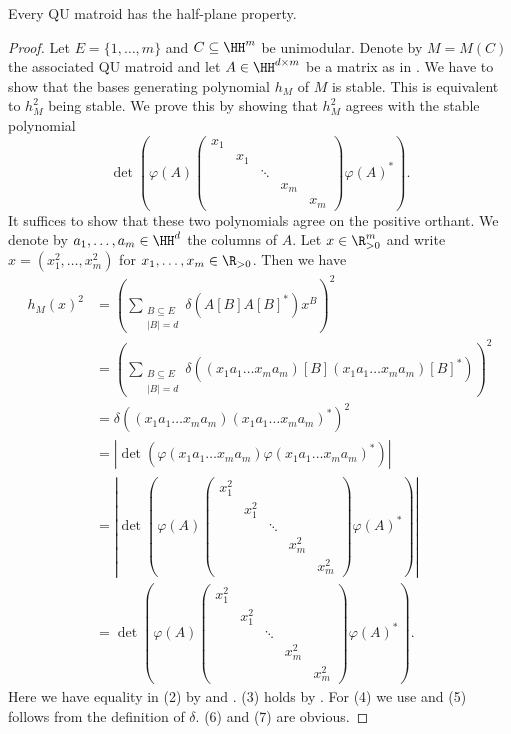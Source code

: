 \begin{thm}
    Every QU matroid has the half-plane property.
\end{thm}
\begin{proof}
  Let $E=\{1,\ldots,m\}$ and $C\subseteq\HH^m$ be unimodular. Denote by $M=M(C)$ the associated QU matroid and let $A\in\HH^{d\times m}$ be a matrix as in . We have to show that the bases generating polynomial $h_M$ of $M$ is stable. This is equivalent to $h_M^2$ being stable. We prove this by showing that $h_M^2$ agrees with the stable polynomial
  \begin{equation*}
    \det\left(\varphi(A)\begin{pmatrix}x_1&&&&\\&x_1&&&\\&&\ddots&&\\&&&x_m&\\&&&&x_m\end{pmatrix}\varphi(A)^*\right).  
  \end{equation*}
    It suffices to show that these two polynomials agree on the positive orthant. We denote by $a_1,\ldots,a_m\in\HH^d$ the columns of $A$. Let $x\in\R_{>0}^m$ and write $x=(x_1^2,\ldots,x_m^2)$ for $x_1,\ldots,x_m\in\R_{>0}$. Then we have
    \allowdisplaybreaks\begin{align}
        h_M(x)^2&=\left(\sum_{\substack{B\subseteq E\\|B|=d}}\delta(A[B]A[B]^*)x^B\right)^2\\
        &=\left(\sum_{\substack{B\subseteq E\\|B|=d}}\delta((x_1a_1\ldots x_ma_m)[B](x_1a_1\ldots x_ma_m)[B]^*)\right)^2\\
        &=\delta((x_1a_1\ldots x_ma_m)(x_1a_1\ldots x_ma_m)^*)^2\\
        &=|\det(\varphi(x_1a_1\ldots x_ma_m)\varphi(x_1a_1\ldots x_ma_m)^*)|\\
        &=|\det\left(\varphi(A)\begin{pmatrix}x_1^2&&&&\\&x_1^2&&&\\
        &&\ddots&&\\&&&x_m^2&\\&&&&x_m^2\end{pmatrix}\varphi(A)^*\right)|\\
        &=\det\left(\varphi(A)\begin{pmatrix}x_1^2&&&&\\&x_1^2&&&\\
        &&\ddots&&\\&&&x_m^2&\\&&&&x_m^2\end{pmatrix}\varphi(A)^*\right).
    \end{align}
    Here we have equality in (2) by  and . (3) holds  by . For (4) we use  and (5) follows from the definition of $\delta$. (6) and (7) are obvious.
\end{proof}

